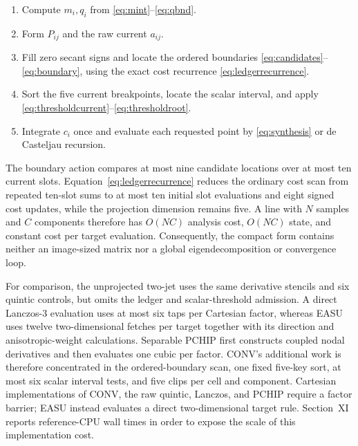 \documentclass[journal]{IEEEtran}
\begin{document}
\begin{enumerate}
\item Compute \(m_i,q_i\) from \eqref{eq:mint}--\eqref{eq:qbnd}.
\item Form \(P_{ij}\) and the raw current \(a_{ij}\).
\item Fill zero secant signs and locate the ordered boundaries
      \eqref{eq:candidates}--\eqref{eq:boundary}, using the exact cost
      recurrence \eqref{eq:ledgerrecurrence}.
\item Sort the five current breakpoints, locate the scalar interval, and
      apply \eqref{eq:thresholdcurrent}--\eqref{eq:thresholdroot}.
\item Integrate \(c_i\) once and evaluate each requested point by
      \eqref{eq:synthesis} or de Casteljau recursion.
\end{enumerate}

The boundary action compares at most nine candidate locations over at most
ten current slots. Equation~\eqref{eq:ledgerrecurrence} reduces the ordinary
cost scan from repeated ten-slot sums to at most ten initial slot evaluations
and eight signed cost updates, while the projection dimension remains five. A line with
\(N\) samples and \(C\) components therefore has \(O(NC)\) analysis cost,
\(O(NC)\) state, and constant cost per target evaluation. Consequently, the
compact form contains neither an image-sized matrix nor a global
eigendecomposition or convergence loop.

For comparison, the unprojected two-jet uses the same derivative stencils and
six quintic controls, but omits the ledger and scalar-threshold admission. A
direct Lanczos-3 evaluation uses at most six taps per Cartesian factor,
whereas EASU uses twelve two-dimensional fetches per target together with its
direction and anisotropic-weight calculations. Separable PCHIP first
constructs coupled nodal derivatives and then evaluates one cubic per factor.
CONV's additional work is therefore concentrated in the ordered-boundary
scan, one fixed five-key sort, at most six scalar interval tests, and five
clips per cell and component. Cartesian implementations of CONV, the raw
quintic, Lanczos, and PCHIP require a factor barrier; EASU instead evaluates a
direct two-dimensional target rule. Section~XI reports reference-CPU wall
times in order to expose the scale of this implementation cost.
\end{document}
